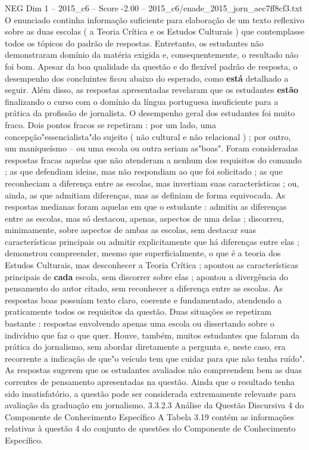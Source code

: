 \begin{textsample}{NEG Dim 1 – 2015\_c6 – Score -2.00 – 2015\_c6/enade\_2015\_jorn\_aec7ff8cf3.txt}
O enunciado continha informação suficiente para elaboração de um texto reflexivo sobre as duas escolas ( a Teoria Crítica e os Estudos Culturais ) que contemplasse todos os tópicos do padrão de respostas.
Entretanto, os estudantes não demonstraram domínio da matéria exigida e, consequentemente, o resultado não foi bom.
Apesar da boa qualidade da questão e do flexível padrão de resposta, o desempenho dos concluintes ficou abaixo do esperado, como \textbf{está} detalhado a seguir.
Além disso, as respostas apresentadas revelaram que os estudantes \textbf{estão} finalizando o curso com o domínio da língua portuguesa insuficiente para a prática da profissão de jornalista.
O desempenho geral dos estudantes foi muito fraco.
Dois pontos fracos se repetiram : por um lado, uma concepção"essencialista"do sujeito ( não cultural e não relacional ) ; por outro, um maniqueísmo – ou uma escola ou outra seriam as"boas".
Foram consideradas respostas fracas aquelas que não atenderam a nenhum dos requisitos do comando ; as que defendiam ideias, mas não respondiam ao que foi solicitado ; as que reconheciam a diferença entre as escolas, mas invertiam suas características ; ou, ainda, as que admitiam diferenças, mas as definiam de forma equivocada.
As respostas medianas foram aquelas em que o estudante : admitiu as diferenças entre as escolas, mas só destacou, apenas, aspectos de uma delas ; discorreu, minimamente, sobre aspectos de ambas as escolas, sem destacar suas características principais ou admitir explicitamente que há diferenças entre elas ; demonstrou compreender, mesmo que superficialmente, o que é a teoria dos Estudos Culturais, mas desconhecer a Teoria Crítica ; apontou as características principais de \textbf{cada} escola, sem discorrer sobre elas ; apontou a divergência do pensamento do autor citado, sem reconhecer a diferença entre as escolas.
As respostas boas possuíam texto claro, coerente e fundamentado, atendendo a praticamente todos os requisitos da questão.
Duas situações se repetiram bastante : respostas envolvendo apenas uma escola ou dissertando sobre o indivíduo que faz o que quer.
Houve, também, muitos estudantes que falaram da prática do jornalismo, sem abordar diretamente a pergunta e, neste caso, era recorrente a indicação de que"o veículo tem que cuidar para que não tenha ruído".
As respostas sugerem que os estudantes avaliados não compreendem bem as duas correntes de pensamento apresentadas na questão.
Ainda que o resultado tenha sido insatisfatório, a questão pode ser considerada extremamente relevante para avaliação da graduação em jornalismo. 3.3.2.3 Análise da Questão Discursiva 4 do Componente de Conhecimento Específico A Tabela 3.19 contém as informações relativas à questão 4 do conjunto de questões do Componente de Conhecimento Específico.

\end{textsample}
